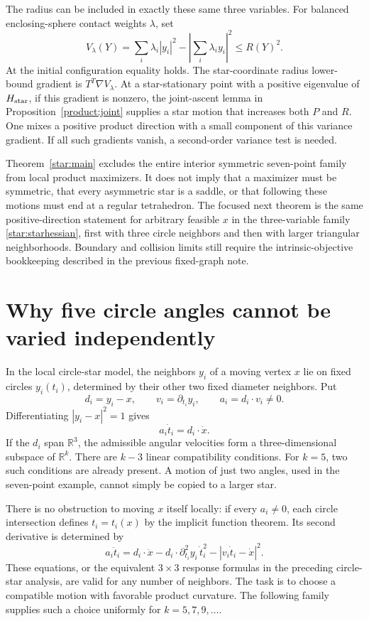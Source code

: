 \documentclass[11pt]{article}
\theoremstyle{remark}\newtheorem{remark}[theorem]{Remark}
\newcommand{\R}{\mathbb R}
\begin{document}
The radius can be included in exactly these same three variables.
For balanced enclosing-sphere contact weights $\lambda$, set
\[
 V_\lambda(Y)=\sum_i\lambda_i|y_i|^2-
                   \left|\sum_i\lambda_i y_i\right|^2\leq R(Y)^2.
\]
At the initial configuration equality holds. The star-coordinate
radius lower-bound gradient is $T^T\nabla V_\lambda$.
At a star-stationary point with a positive eigenvalue of
$H_{\rm star}$, if this gradient is nonzero, the joint-ascent lemma
in Proposition~\ref{product:joint} supplies a star motion that
increases both $P$ and $R$. One mixes a positive product direction
with a small component of this variance gradient. If all such
gradients vanish, a second-order variance test is needed.

Theorem~\ref{star:main} excludes the entire interior symmetric seven-point
family from local product maximizers. It does not imply that a
maximizer must be symmetric, that every asymmetric star is a saddle,
or that following these motions must end at a regular tetrahedron.
The focused next theorem is the same positive-direction statement
for arbitrary feasible $x$ in the three-variable family
\eqref{star:starhessian}, first with three circle neighbors and then with
larger triangular neighborhoods. Boundary and collision limits still
require the intrinsic-objective bookkeeping described in the previous
fixed-graph note.


\section{Why five circle angles cannot be varied independently}
In the local circle-star model, the neighbors $y_i$ of a moving vertex $x$
lie on fixed circles $y_i(t_i)$, determined by their other two fixed
diameter neighbors. Put
\[
 d_i=y_i-x,\qquad v_i=\partial_{t_i}y_i,\qquad
 a_i=d_i\cdot v_i\ne0.
\]
Differentiating $|y_i-x|^2=1$ gives
\begin{equation}\label{many:compatibility}
 a_i\dot t_i=d_i\cdot\dot x.
\end{equation}
If the $d_i$ span $\R^3$, the admissible angular velocities form a
three-dimensional subspace of $\R^k$. There are $k-3$ linear
compatibility conditions. For $k=5$, two such conditions are already
present. A motion of just two angles, used in the seven-point example,
cannot simply be copied to a larger star.

There is no obstruction to moving $x$ itself locally: if every
$a_i\ne0$, each circle intersection defines $t_i=t_i(x)$ by the
implicit function theorem. Its second derivative is determined by
\begin{equation}\label{many:secondcompatibility}
 a_i\ddot t_i=d_i\cdot\ddot x
 -d_i\cdot\partial_{t_i}^2y_i\,\dot t_i^2
 -|v_i\dot t_i-\dot x|^2.
\end{equation}
These equations, or the equivalent $3\times3$ response formulas in
the preceding circle-star analysis, are valid for any number of neighbors.
The task is to choose a compatible motion with favorable product
curvature. The following family supplies such a choice uniformly
for $k=5,7,9,\ldots$.
\end{document}
